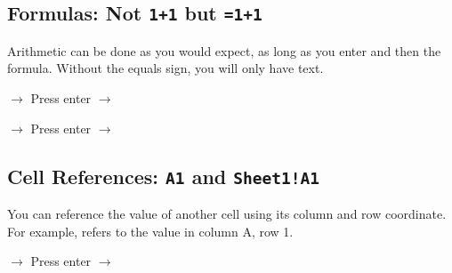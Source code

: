 \subsection{Formulas: Not \texttt{1+1} but \texttt{=1+1}}


Arithmetic can be done as you would expect, as long as you enter \code{=} and then the formula. Without the equals sign, you will only have text. 

\medskip 


\begin{center}
 $\rightarrow$  Press enter $\rightarrow$ 

 $\rightarrow$  Press enter $\rightarrow$ 
\end{center}






\subsection{Cell References: \texttt{A1} and \texttt{Sheet1!A1}}

You can reference the value of another cell using its column and row coordinate. For example,  refers to the value in column A, row 1. 

\begin{center}
 $\rightarrow$  Press enter $\rightarrow$ 
\end{center}

